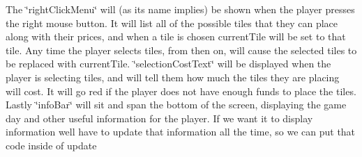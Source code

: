 \begin{DoxyCode}{0}
\DoxyCodeLine{    \}));}

\end{DoxyCode}


The {\ttfamily \char`\"{}right\+Click\+Menu\char`\"{}} will (as its name implies) be shown when the player presses the right mouse button. It will list all of the possible tiles that they can place along with their prices, and when a tile is chosen {\ttfamily current\+Tile} will be set to that tile. Any time the player selects tiles, from then on, will cause the selected tiles to be replaced with {\ttfamily current\+Tile}. {\ttfamily \char`\"{}selection\+Cost\+Text\char`\"{}} will be displayed when the player is selecting tiles, and will tell them how much the tiles they are placing will cost. It will go red if the player does not have enough funds to place the tiles. Lastly {\ttfamily \char`\"{}info\+Bar\char`\"{}} will sit and span the bottom of the screen, displaying the game day and other useful information for the player. If we want it to display information we\textquotesingle{}ll have to update that information all the time, so we can put that code inside of {\ttfamily update}



